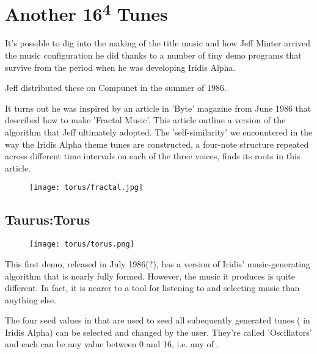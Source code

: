 \chapter{Another 16\textsuperscript{4} Tunes} 
\label{sec:torusmusic}

It's possible to dig into the making of the title music and how Jeff Minter
arrived the music configuration he did thanks to a number of tiny demo programs that
survive from the period when he was developing Iridis Alpha.

Jeff distributed these on Compunet in the summer of 1986.

It turns out he was inspired by an article in 'Byte' magazine from June 1986 that
described how to make 'Fractal Music'. This article outline a version of the
algorithm that Jeff ultimately adopted. The 'self-similarity' we encountered
in the way the Iridis Alpha theme tunes are constructed, a four-note structure
repeated across different time intervals on each of the three voices, finds its
roots in this article.


\begin{figure}[H]
{
  \begin{adjustbox}{width=11cm,center}
  \texttt{[image: torus/fractal.jpg]}%
    \end{adjustbox}
}\caption[]{}
\end{figure}


\section{Taurus:Torus}
\begin{figure}[H]
{
  \begin{adjustbox}{width=11cm,center}
  \texttt{[image: torus/torus.png]}%
    \end{adjustbox}
}\caption[]{}
\end{figure}

This first demo, released in July 1986(?), has a version of Iridis' music-generating
algorithm that is nearly fully formed. However, the music it produces is quite
different. In fact, it is nearer to a tool for listening to and selecting music than
anything else.

The four seed values in  that are used to seed all subequently
generated tunes ( in Iridis Alpha) can be selected and changed by the
user. They're called 'Oscillators' and each can be any value between 0 and 16, i.e. any of
.


